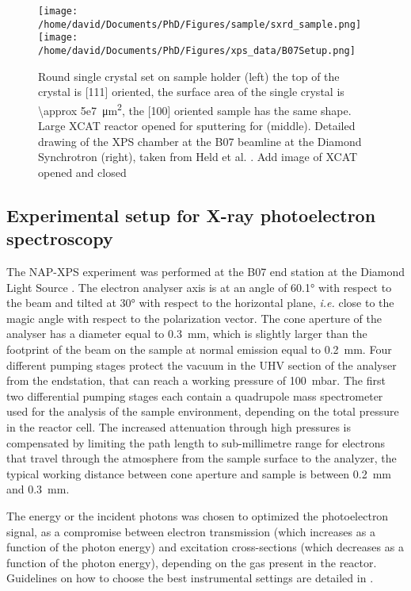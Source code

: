 \begin{figure}[!htb]
    \centering
    \texttt{[image: /home/david/Documents/PhD/Figures/sample/sxrd\_sample.png]}
    \texttt{[image: /home/david/Documents/PhD/Figures/xps\_data/B07Setup.png]}
    \caption{
        Round single crystal set on sample holder (left) the top of the crystal is [111] oriented, the surface area of the single crystal is \qty{\approx 5e7}{\um^2}, the [100] oriented sample has the same shape.
        Large XCAT reactor opened for sputtering for (middle).
        Detailed drawing of the XPS chamber at the B07 beamline at the Diamond Synchrotron (right), taken from Held et al. \parencite*{Held2020}.
        \textcolor{Important}{Add image of XCAT opened and closed}
    }
    \label{fig:SampleSXRD}
\end{figure}

\subsection{Experimental setup for X-ray photoelectron spectroscopy} \label{sec:XPS111}

The NAP-XPS experiment was performed at the B07 end station at the Diamond Light Source \parencite{Held2020}.
The electron analyser axis is at an angle of \ang{60.1} with respect to the beam and tilted at \ang{30} with respect to the horizontal plane, \textit{i.e.} close to the magic angle with respect to the polarization vector.
The cone aperture of the analyser has a diameter equal to \qty{0.3}{\mm}, which is slightly larger than the footprint of the beam on the sample at normal emission equal to \qty{0.2}{\mm}.
Four different pumping stages protect the vacuum in the UHV section of the analyser from the endstation, that can reach a working pressure of \qty{100}{\milli\bar}.
The ﬁrst two differential pumping stages each contain a quadrupole mass spectrometer used for the analysis of the sample environment, depending on the total pressure in the reactor cell.
The increased attenuation through high pressures is compensated by limiting the path length to sub-millimetre range for electrons that travel through the atmosphere from the sample surface to the analyzer, the typical working distance between cone aperture and sample is between \qty{0.2}{\mm} and \qty{0.3}{\mm}.

The energy or the incident photons was chosen to optimized the photoelectron signal, as a compromise between electron transmission (which increases as a function of the photon energy) and excitation cross-sections (which decreases as a function of the photon energy), depending on the gas present in the reactor.
Guidelines on how to choose the best instrumental settings are detailed in \parencite{Held2020}.
